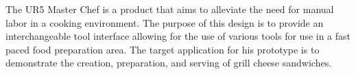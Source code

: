 The UR5 Master Chef is a product that aims to alleviate the need for manual labor in a cooking environment.  The purpose of this design is to provide an interchangeable tool interface allowing for the use of various tools for use in a fast paced food preparation area. The target application for his prototype is to demonstrate the creation, preparation, and serving of grill cheese sandwiches.
